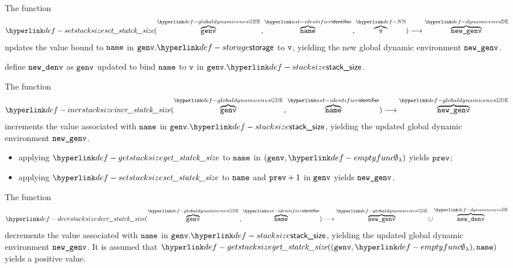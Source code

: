 \FormallyParagraph
\begin{mathpar}
\end{mathpar}

\hypertarget{def-setstacksize}{}
The function
\[
\setstacksize(\overname{\genv}{\globaldynamicenvs} \aslsep \overname{\name}{\identifier} \aslsep \overname{\vv}{\N}) \aslto
\overname{\newgenv}{\dynamicenvs}
\]
updates the value bound to $\name$ in $\genv.\storage$ to $\vv$, yielding the new global dynamic environment $\newgenv$.

\ProseParagraph
define $\newdenv$ as $\genv$ updated to bind $\name$ to $\vv$ in $\genv.\stacksize$.

\FormallyParagraph
\begin{mathpar}
\end{mathpar}

\hypertarget{def-incrstacksize}{}
The function
\[
\incrstacksize(\overname{\genv}{\globaldynamicenvs} \aslsep \overname{\name}{\identifier}) \aslto
\overname{\newgenv}{\globaldynamicenvs}
\]
increments the value associated with $\name$ in $\genv.\stacksize$, yielding the updated global dynamic environment $\newgenv$.

\ProseParagraph
\AllApply
\begin{itemize}
  \item applying $\getstacksize$ to $\name$ in $(\genv, \emptyfunc)$ yields $\vprev$;
  \item applying $\setstacksize$ to $\name$ and $\vprev + 1$ in $\genv$ yields $\newgenv$.
\end{itemize}

\FormallyParagraph
\begin{mathpar}
\end{mathpar}

\hypertarget{def-decrstacksize}{}
The function
\[
\decrstacksize(\overname{\genv}{\globaldynamicenvs} \aslsep \overname{\name}{\identifier}) \aslto
\overname{\newgenv}{\globaldynamicenvs} \cup \overname{\newdenv}{\dynamicenvs}
\]
decrements the value associated with $\name$ in $\genv.\stacksize$, yielding the updated global dynamic environment $\newgenv$.
It is assumed that $\getstacksize((\genv, \emptyfunc), \name)$ yields a positive value.

